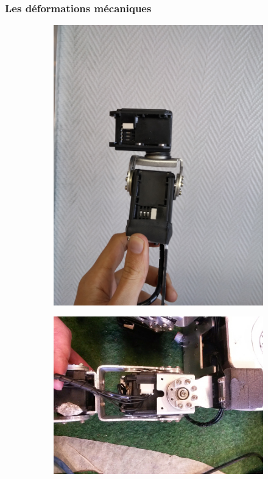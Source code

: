 \subsubsection{Les déformations mécaniques}

\begin{figure}[htb]
    \centerfloat
    \begin{subfigure}{0.4\paperwidth}
        \centering
        \includegraphics[width=1.0\linewidth]{../media/torsion_meca1.jpg}
    \end{subfigure}
    \begin{subfigure}{0.4\paperwidth}
        \centering
        \includegraphics[width=1.0\linewidth]{../media/torsion_meca2.jpg}

\end{subfigure}
\end{figure}
